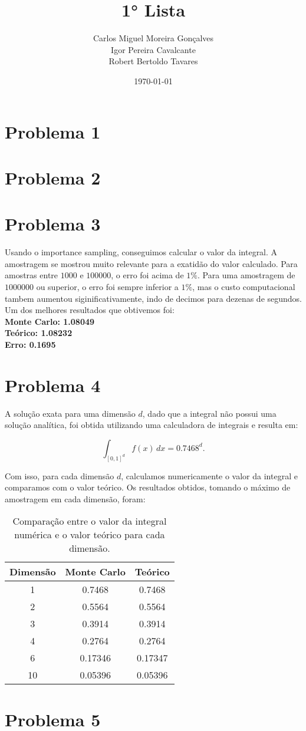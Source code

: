 \documentclass[a4paper, 12pt]{article}
\title{\textbf{1° Lista}}
\author{
    Carlos Miguel Moreira Gonçalves \\
    Igor Pereira Cavalcante \\
    Robert Bertoldo Tavares \\
}
\date{\today}
\begin{document}
\maketitle
\thispagestyle{fancy}

\section*{Problema 1}
\section*{Problema 2}
\section*{Problema 3}
Usando o importance sampling, conseguimos calcular o valor da integral. A amostragem se mostrou 
muito relevante para a exatidão do valor calculado. Para amostras entre \(1000\) e \(100000\), o erro
foi acima de \(1\%\). Para uma amostragem de \(1000000\) ou superior, o erro foi sempre inferior a \(1\%\),
mas o custo computacional tambem aumentou siginificativamente, indo de decimos para dezenas de segundos. 
Um dos melhores resultados que obtivemos foi:
\\

\noindent\textbf{Monte Carlo: 1.08049}\\
\textbf{Teórico: 1.08232}\\
\textbf{Erro: 0.1695}

\section*{Problema 4}
A solução exata para uma dimensão \(d\), dado que a integral não possui uma solução analítica, foi 
obtida utilizando uma calculadora de integrais e resulta em:

\begin{equation}
    \int_{[0,1]^d} f(x) \, dx = 0.7468^{d}.
\end{equation}

Com isso, para cada dimensão \(d\), calculamos numericamente o valor da integral e comparamos com o valor 
teórico. Os resultados obtidos, tomando o máximo de amostragem em cada dimensão, foram:

\begin{table}
    \centering
    \begin{tabular}{|c|c|c|}
        \hline
        Dimensão & Monte Carlo & Teórico \\
        \hline
        1 & 0.7468 & 0.7468 \\
        2 & 0.5564 & 0.5564 \\
        3 & 0.3914 & 0.3914 \\
        4 & 0.2764 & 0.2764 \\
        6 & 0.17346 & 0.17347 \\
        10 & 0.05396 & 0.05396 \\
        \hline
    \end{tabular}
    \caption{Comparação entre o valor da integral numérica e o valor teórico para cada dimensão.}
\end{table}


\section*{Problema 5}
\end{document}
